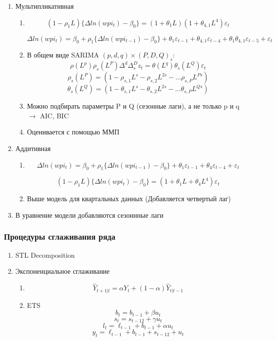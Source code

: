 \documentclass[a4paper, 12pt]{article}
\begin{document}
\begin{enumerate}
    \item Мультипликативная
    \begin{enumerate}
        \item \[(1 - \rho_1 L)\{\Delta ln(wpi_t) - \beta_0\} = (1 + \theta_1 L)(1 + \theta_{4, 1} L^4)\varepsilon_t\]
        
        \[\Delta ln(wpi_t) = \beta_0 + \rho_1\{\Delta ln(wpi_{t - 1}) - \beta_0\} + \theta_1 \varepsilon_{t - 1} + \theta_{4, 1} \varepsilon_{t - 4} + \theta_1 \theta_{4, 1} \varepsilon_{t - 5} + \varepsilon_t\]
        \item В общем виде SARIMA $(p, d , q) \times (P, D, Q)_s$:
        \[\rho(L^p) \rho_s(L^P) \Delta^d \Delta_s^D z_t = \theta(L^q) \theta_s(L^Q)\varepsilon_t\]
        \[\rho_s(L^P) = (1 - \rho_{s, 1}L^s - \rho_{s, 2}L^{2s} - ... \rho_{s, P}L^{Ps})\]
        \[\theta_s(L^Q) = (1 - \theta_{s, 1}L^s - \theta_{s, 2}L^{2s} - ... \theta_{s, P}L^{Qs})\]
        \item Можно подбирать параметры P и Q (сезонные лаги), а не только p и q $\rightarrow$ AIC, BIC
        \item Оценивается с помощью ММП
    \end{enumerate}
    \item Аддитивная
    \begin{enumerate}
        \item \[\Delta ln(wpi_t) = \beta_0 + \rho_1\{\Delta ln(wpi_{t - 1}) - \beta_0\} + \theta_1 \varepsilon_{t - 1} + \theta_4 \varepsilon_{t - 4} + \varepsilon_t\]
        
        \[(1 - \rho_1 L)\{\Delta ln(wpi_t) - \beta_0\} = (1 + \theta_1 L + \theta_4 L^4)\varepsilon_t\]
        \item Выше модель для квартальных данных (Добавляется четвертый лаг)
    \end{enumerate}
    \item В уравнение модели добавляются сезоннные лаги
\end{enumerate}

\subsubsection{Процедуры сглаживания ряда}

\begin{enumerate}
    \item STL Decomposition
    \item Экспоненциальное сглаживание
    \begin{enumerate}
        \item \[\hat Y_{t+1 | t} = \alpha Y_t + (1 - \alpha) \hat Y_{t|t - 1}\]
        \item ETS
        \[b_{t} = b_{t-1} + \beta u_t\]
        \[s_t = s_{t - 12} + \gamma u_t\]
        \[l_t = \ell_{t - 1} + b_{t - 1} + \alpha u_{t}\]
        \[y_t = \ell_{t - 1} + b_{t - 1} + s_{t - 12} + u_t\]
    \end{enumerate}
\end{enumerate}
\end{document}

